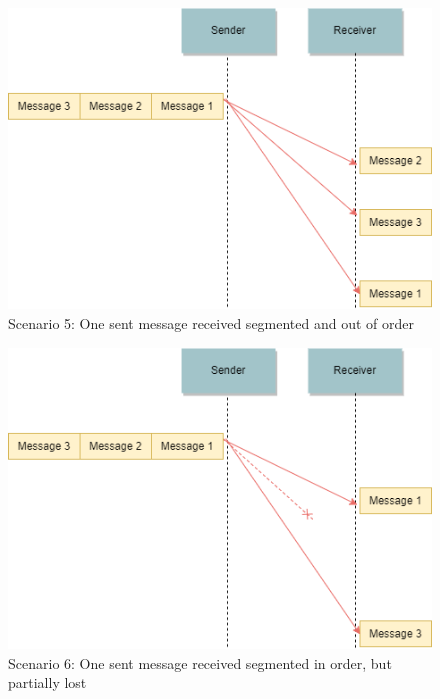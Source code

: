 \begin{figure}[ht!]
\centerline{\includegraphics[scale=0.6]{Figures/scenario5}}
 \caption{Scenario 5: One sent message received segmented and out of order}
\label{scenario5}
\end{figure}

\begin{figure}[ht!]
\centerline{\includegraphics[scale=0.6]{Figures/scenario6}}
 \caption{Scenario 6: One sent message received segmented in order, but partially lost}
\label{scenario6}
\end{figure}

